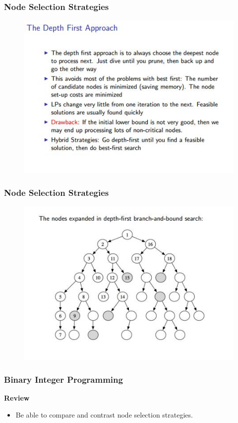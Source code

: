 \documentclass{beamer}
\begin{document}
	\begin{frame}
		\frametitle{Node Selection Strategies}
		\large
		\begin{figure}
			\centering
			\includegraphics[width=1.1\linewidth]{NodeSelection4}
		\end{figure}
	\end{frame}
	\begin{frame}
		\frametitle{Node Selection Strategies}
		\large
		\begin{figure}
			\centering
			\includegraphics[width=1.1\linewidth]{NodeSelection5}
		\end{figure}
	\end{frame}
\begin{frame}
	\frametitle{Binary Integer Programming}
	\Large
	\noindent\textbf{Review}
	\begin{itemize}
		\item Be able to compare and contrast node selection strategies.
	\end{itemize}
\end{frame}
\end{document}
